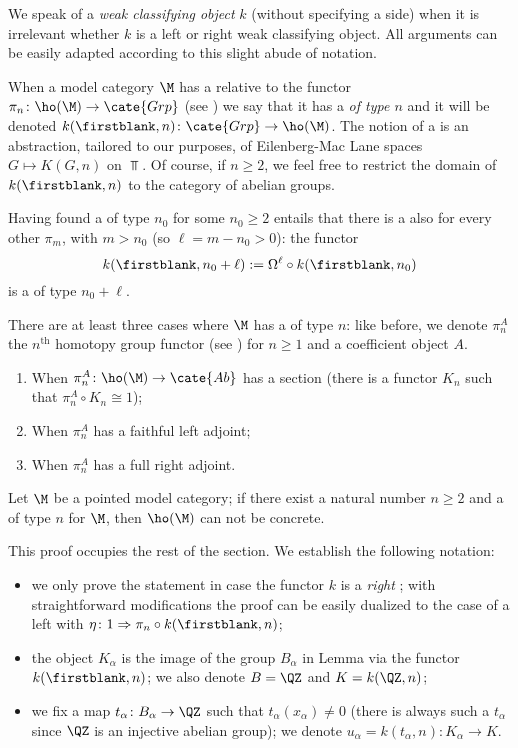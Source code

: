 \begin{notat}
We speak of a \emph{weak classifying object} $k$ (without specifying a side) when it is irrelevant whether $k$ is a left or right weak classifying object. All arguments can be easily adapted according to this slight abude of notation.

When a model category $\M$ has a \wco relative to the functor $\pi_n \colon \ho(\M) \to \cate{Grp}$ (see ) we say that it has a \emph{\wco of type $n$} and it will be denoted $k(\firstblank,n) \colon \cate{Grp}\to \ho(\M)$. The notion of a \wco is an abstraction, tailored to our purposes, of Eilenberg-Mac Lane spaces $G\mapsto K(G,n)$ on $\Top$. Of course, if $n\ge 2$, we feel free to restrict the domain of $k(\firstblank,n)$ to the category of abelian groups.
\end{notat}
\begin{remark}
Having found a \wco of type $n_0$ for some $n_0\ge 2$ entails that there is a \wco also for every other $\pi_m$, with $m>n_0$ (so $\ell = m-n_0 > 0$): the functor
\[
k(\firstblank,n_0+\ell) := \Omega^\ell \circ k(\firstblank,n_0)
\]
is a \wco of type $n_0+\ell$.
\end{remark}
\begin{remark}
There are at least three cases where $\M$ has a \wco of type $n$: like before, we denote $\pi_n^A$ the $n^\text{th}$ homotopy group functor (see ) for $n\ge 1$ and a coefficient object $A$.
\begin{enumerate}
	\item When $\pi_n^A\colon \ho(\M)\to \cate{Ab}$ has a section (\ie there is a functor $K_n$ such that $\pi_n^A\circ K_n \cong 1$);
	\item When $\pi_n^A$ has a faithful left adjoint;
	\item When $\pi_n^A$ has a full right adjoint.
\end{enumerate}
\end{remark}
\begin{theorem}\label{ginnunga}
Let $\M$ be a pointed model category; if there exist a natural number $n\ge 2$ and a \wco of type $n$ for $\M$, then $\ho(\M)$ can not be concrete.
\end{theorem}
This proof occupies the rest of the section. We establish the following notation:
\begin{itemize}
	\item we only prove the statement in case the functor $k$ is a \emph{right} \wco; with straightforward modifications the proof can be easily dualized to the case of a left \wco with $\eta\colon 1 \Rightarrow \pi_n\circ k(\firstblank,n)$;
	\item the object $K_\alpha$ is the image of the group $B_\alpha$ in Lemma  via the functor $k(\firstblank,n)$; we also denote $B=\QZ$ and $K = k(\QZ,n)$;
	\item we fix a map $t_\alpha \colon B_\alpha \to \QZ$ such that $t_\alpha(x_\alpha)\neq 0$ (there is always such a $t_\alpha$ since $\QZ$ is an injective abelian group); we denote $u_\alpha = k(t_\alpha,n) \colon K_\alpha \to K$.
\end{itemize}
